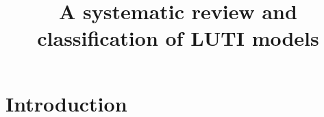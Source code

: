 \documentclass{article}
\title{A systematic review and classification of LUTI models}
\author{}
\date{}
\begin{document}
\maketitle




\section{Introduction}
\end{document}
